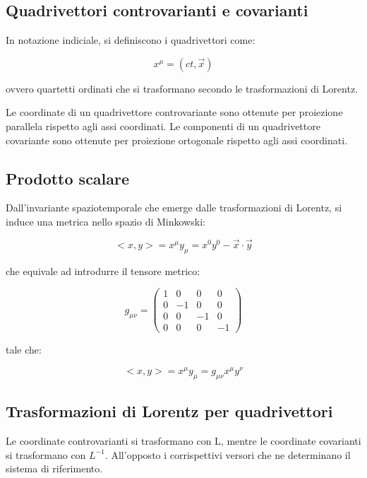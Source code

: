 \documentclass{article}
\begin{document}
\subsection{Quadrivettori controvarianti e covarianti}
In notazione indiciale, si definiscono i quadrivettori come:

\begin{equation}
    x^\mu = (ct, \vec{x})
\end{equation}

ovvero quartetti ordinati che si trasformano secondo le trasformazioni di Lorentz.

Le coordinate di un quadrivettore controvariante sono ottenute per proiezione parallela rispetto agli assi coordinati.
Le componenti di un quadrivettore covariante sono ottenute per proiezione ortogonale rispetto agli assi coordinati.

\subsection{Prodotto scalare}
Dall'invariante spaziotemporale che emerge dalle trasformazioni di Lorentz, si induce una metrica nello spazio di Minkowski:

\begin{equation}
<x,y> = x^\mu y_\mu = x^0y^0 - \vec{x} \cdot \vec{y}
\end{equation}

che equivale ad introdurre il tensore metrico:

\begin{equation}
g_{\mu\nu} = 
\begin{pmatrix}
1 & 0 & 0 & 0 \\
0 & -1 & 0 & 0 \\
0 & 0 & -1 & 0 \\
0 & 0 & 0 & -1
\end{pmatrix}
\end{equation}

tale che:

\begin{equation}
<x,y> = x^\mu y_\mu = g_{\mu\nu}x^\mu y^\nu
\end{equation}

\subsection{Trasformazioni di Lorentz per quadrivettori}

Le coordinate controvarianti si trasformano con L, mentre le coordinate covarianti si trasformano con $L^{-1}$.
All'opposto i corrispettivi versori che ne determinano il sistema di riferimento.
\end{document}
